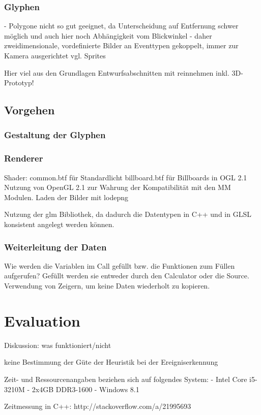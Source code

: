 \subsection{Glyphen}
- Polygone nicht so gut geeignet, da Unterscheidung auf Entfernung schwer möglich und auch hier noch Abhängigkeit vom Blickwinkel
- daher zweidimensionale, vordefinierte Bilder an Eventtypen gekoppelt, immer zur Kamera ausgerichtet vgl. Sprites

Hier viel aus den Grundlagen Entwurfsabschnitten mit reinnehmen inkl. 3D-Prototyp!

\section{Vorgehen}
\subsection{Gestaltung der Glyphen}
\subsection{Renderer}
Shader:
common.btf für Standardlicht
billboard.btf für Billboards in OGL 2.1
Nutzung von OpenGL 2.1 zur Wahrung der Kompatibilität mit den MM Modulen.
Laden der Bilder mit lodepng

Nutzung der glm Bibliothek, da dadurch die Datentypen in C++ und in GLSL konsistent angelegt werden können.

\subsection{Weiterleitung der Daten}

Wie werden die Variablen im Call gefüllt bzw. die Funktionen zum Füllen aufgerufen? Gefüllt werden sie entweder durch den Calculator oder die Source. Verwendung von Zeigern, um keine Daten wiederholt zu kopieren.


\chapter{Evaluation}

Diskussion: was funktioniert/nicht

keine Bestimmung der Güte der Heuristik bei der Ereigniserkennung

Zeit- und Ressourcenangaben beziehen sich auf folgendes System:
- Intel Core i5-3210M
- 2x4GB DDR3-1600
- Windows 8.1

Zeitmessung in C++: http://stackoverflow.com/a/21995693

